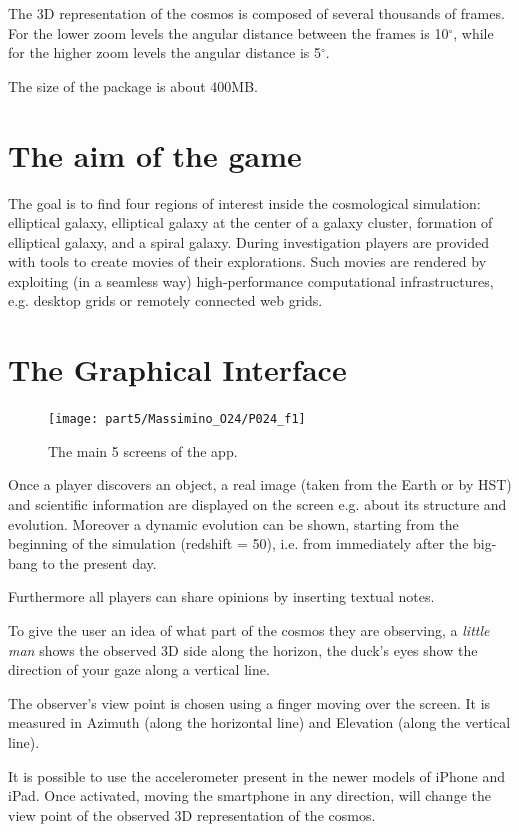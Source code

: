 The 3D representation of the cosmos is composed of several thousands of frames. For the lower zoom levels the angular distance  between the frames is 10$^\circ$, while for the higher zoom levels the angular distance is 5$^\circ$.

The size of the package is about 400MB.

\section{The aim of the game}
The goal is to find four regions of interest inside the cosmological simulation:  elliptical galaxy, elliptical galaxy at the center of a galaxy cluster, formation of elliptical galaxy, and a spiral galaxy. During investigation players are provided with tools to create movies of their explorations. Such movies are rendered by exploiting (in a seamless way) high-performance computational infrastructures, e.g. desktop grids or remotely connected web grids.

\section{The Graphical Interface}

\begin{figure}[h!]
\centering
\texttt{[image: part5/Massimino\_O24/P024\_f1]}
\caption{The main 5 screens of the app.}
\end{figure}
Once a player discovers an object, a real image (taken from the Earth or by HST) and scientific information are displayed on the screen e.g. about its structure and evolution. Moreover a dynamic evolution can be shown, starting from the beginning of the simulation (redshift = 50), i.e. from immediately after the big-bang to the present day.

Furthermore all players can share opinions by inserting textual notes.

To give the user an idea of what part of the cosmos they are observing, a \emph{little man} shows the observed  3D side along the horizon,  the duck's eyes show the direction of your gaze along a vertical line.

The observer's view point  is chosen using a finger moving over the screen. It is measured in Azimuth (along the horizontal line) and Elevation (along the vertical line).

It is possible to use the accelerometer present in the newer models of iPhone and iPad. Once activated, moving the smartphone in any direction, will change the view point of the observed 3D 
representation of the cosmos.

